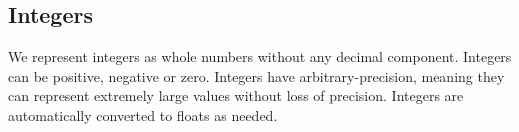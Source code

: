 \subsection*{Integers}

We represent integers as whole numbers without any decimal component. Integers can be positive, negative or zero. Integers have arbitrary-precision, meaning they can represent extremely large values without loss of precision. Integers are automatically converted to floats as needed.
